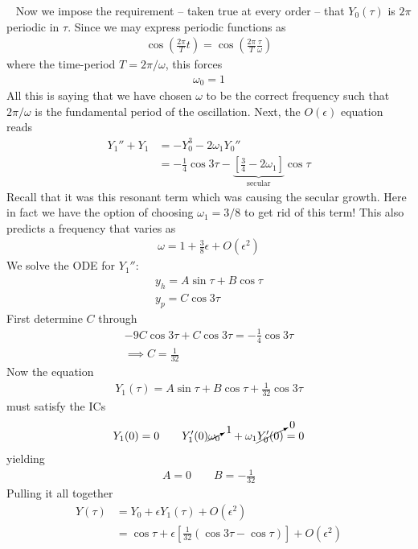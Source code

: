 \ \newline
Now we impose the requirement -- taken true at every order -- that $Y_0(\tau)$ is $2\pi $ periodic in $\tau$. Since we may express periodic functions as
\begin{gather*}
	\cos \left(\frac{2\pi}{T} t\right) = \cos \left(\frac{2\pi}{T}\frac{\tau}{\omega }\right)
\end{gather*} where the time-period $T=2\pi/\omega $, this forces
\begin{gather*}
	\omega_0 = 1
\end{gather*} 
All this is saying that we have chosen $\omega$ to be the correct frequency such that $2\pi/\omega$ is the fundamental period of the oscillation. Next, the $O(\epsilon)$ equation reads
\begin{align*}
	Y_1'' + Y_1 &= - Y_0^3 - 2 \omega_1 Y_0'' \\
	&= -\frac{1}{4} \cos 3 \tau - \underbrace{\left[\frac{3}{4} - 2 \omega_1\right]}_\text{secular} \cos \tau
\end{align*}
Recall that it was this resonant term which was causing the secular growth. Here in fact we have the option of choosing $\omega_1 = 3/8$ to get rid of this term! This also predicts a frequency that varies as
\begin{gather*}
	\omega = 1 + \frac{3}{8} \epsilon + O(\epsilon^2)
\end{gather*}
We solve the ODE for $Y_1''$: 
\begin{gather*}
	y_h = A \sin \tau + B \cos \tau \\
	y_p = C \cos 3 \tau 
\end{gather*}
First determine $C$ through
\begin{gather*}
	-9C \cos 3 \tau + C \cos 3 \tau = -\frac{1}{4} \cos 3 \tau \\
	\implies C = \frac{1}{32}
\end{gather*}
Now the equation
\begin{gather*}
	Y_1(\tau) = A \sin \tau + B \cos \tau + \frac{1}{32} \cos 3 \tau 
\end{gather*}
must satisfy the ICs
\begin{gather*}
Y_1(0) = 0 \qquad Y_1'(0)\cancelto{1}{\omega_0}  \quad + \omega_1 \cancelto{0}{Y_0'(0)} = 0
\end{gather*}
yielding
\begin{gather*}
	A = 0 \qquad B = -\frac{1}{32}
\end{gather*}
Pulling it all together
\begin{align*}
	Y(\tau) &= Y_0 + \epsilon Y_1(\tau ) + O(\epsilon^2) \\
	&= \cos \tau + \epsilon \left[\frac{1}{32}\left(\cos 3 \tau - \cos \tau\right)\right] + O(\epsilon^2) 
\end{align*}
